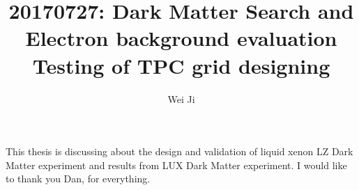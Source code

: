 \documentclass{report}
\begin{document}
\title{20170727: Dark Matter Search and Electron background evaluation\\
            Testing of TPC grid designing}
\author{Wei Ji}
\fourthreader{} %
%
 
\beforepreface
{}
This thesis is discussing about the design and validation of liquid xenon LZ Dark Matter experiment and results from LUX Dark Matter experiment.   
I would like to thank you Dan, for everything.
\afterpreface
%
%
%
%
%
%
%
%
%
%
%
%


%

\appendix
%
%
%



%
%

\printbibliography[heading=bibintoc]
\end{document}
